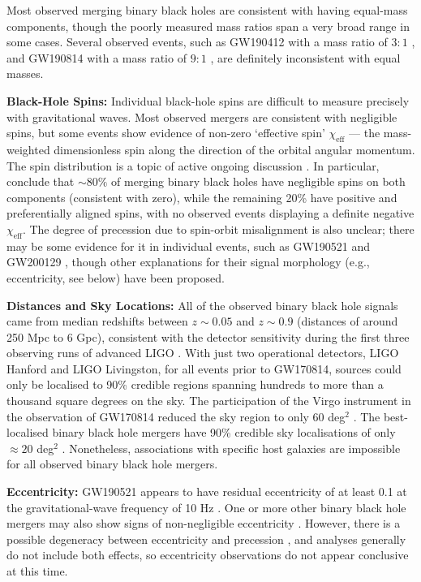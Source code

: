 \documentclass[review]{elsarticle}
\begin{document}
Most observed merging binary black holes are consistent with having equal-mass components, though the poorly measured mass ratios span a very broad range in some cases.  Several observed events, such as GW190412 with a mass ratio of $3:1$ \citep{GW190412}, and GW190814 with a mass ratio of $9:1$ \citep{GW190814}, are definitely inconsistent with equal masses.

\textbf{Black-Hole Spins:} Individual black-hole spins are difficult to measure precisely with gravitational waves.  Most observed mergers are consistent with negligible spins, but some events show evidence of non-zero `effective spin' $\chi_\textrm{eff}$ --- the mass-weighted dimensionless spin along the direction of the orbital angular momentum.  The spin distribution is a topic of active ongoing discussion \citep[e.g.,][]{GWTC2:pop,Roulet:2021,Callister:2021,Galaudage:2021,GWTC3:pop}.  In particular, \citet{Galaudage:2021} conclude that $\sim 80\%$ of merging binary black holes have negligible spins on both components (consistent with zero), while the remaining 20\% have positive and preferentially aligned spins, with no observed events displaying a definite negative $\chi_\textrm{eff}$.  The degree of precession due to spin-orbit misalignment is also unclear; there may be some evidence for it in individual events, such as GW190521 \citep{GW190521} and GW200129 \citep{Hannam:2021}, though other explanations for their signal morphology (e.g., eccentricity, see below) have been proposed.

\textbf{Distances and Sky Locations:} All of the observed binary black hole signals came from median redshifts between $z\sim 0.05$ and $z \sim 0.9$ (distances of around 250 Mpc to 6 Gpc), consistent with the detector sensitivity during the first three observing runs of advanced LIGO \citep{GWTC3}.  With just two operational detectors, LIGO Hanford and LIGO Livingston, for all events prior to GW170814, sources could only be localised to 90\% credible regions spanning hundreds to more than a thousand square degrees on the sky.  The participation of the Virgo instrument in the observation of GW170814 reduced the sky region to only 60 deg$^2$ \citep{GW170814}.   The best-localised binary black hole mergers have 90\% credible sky localisations of only $\approx 20$ deg$^2$ \citep{GWTC2}.  Nonetheless, associations with specific host galaxies are impossible for all observed binary black hole mergers.  

\textbf{Eccentricity:}  GW190521 appears to have residual eccentricity of at least 0.1 at the gravitational-wave frequency of 10 Hz \citep{RomeroShaw:2020GW190521}.  One or more other binary black hole mergers may also show signs of non-negligible eccentricity \citep{RomeroShaw:2021}.  However, there is a possible degeneracy between eccentricity and precession \citep{Bustillo:2021}, and analyses generally do not include both effects, so eccentricity observations do not appear conclusive at this time.
\end{document}
